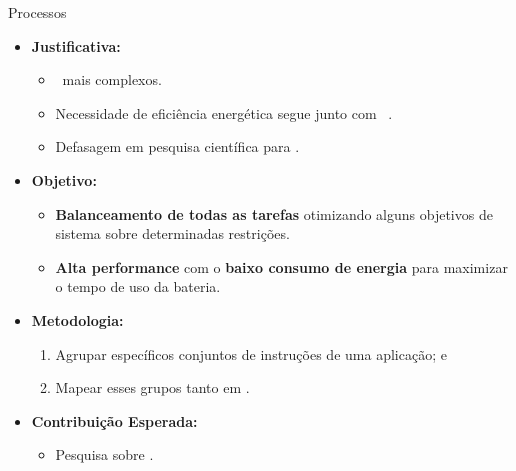       \begin{frame}{Processos} \vspace{-1em}
         \begin{itemize} \setlength{\itemsep}{1.2em}
            \item \textbf{Justificativa:}
            \begin{itemize} \setlength{\itemsep}{0.3em}
               \item \Designs\ mais complexos.
               
               \item Necessidade de eficiência energética segue junto com \speedup\ \cite{Trindade2016, Arato2005, Yan2017}.
               
               \item Defasagem em pesquisa científica para \wearables.
               
            \end{itemize}
         
            \item \textbf{Objetivo:} 
            \begin{itemize} \setlength{\itemsep}{0.3em}
               \item \textbf{Balanceamento de todas as tarefas} otimizando alguns objetivos de sistema sobre determinadas restrições.
               
               \item \textbf{Alta performance} com o \textbf{baixo consumo de energia} para maximizar o tempo de uso da bateria.
            \end{itemize}
            \item \textbf{Metodologia:} 
            \begin{enumerate} \setlength{\itemsep}{0.3em}
               \item Agrupar específicos conjuntos de instruções de uma aplicação; e
               \item Mapear esses grupos tanto em \hs.
            \end{enumerate}
         
            \item \textbf{Contribuição Esperada:} 
            \begin{itemize} \setlength{\itemsep}{0.3em}
               \item Pesquisa sobre \wearables.
            \end{itemize}
         \end{itemize}
      \end{frame}
